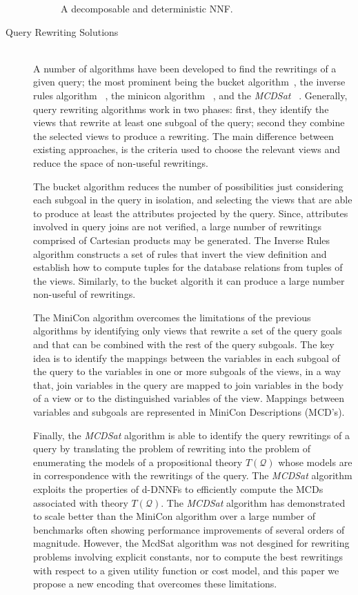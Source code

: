 \documentclass{llncs}
\newcommand{\Q}{\mathcal{Q}}
\newcommand{\Theory}[1]{T(#1)}
\begin{document}
\begin{description}
\begin{figure}
\centering
\caption{A decomposable and deterministic NNF.}
\label{fig:dnnf}
\end{figure}


\item[Query Rewriting Solutions] \mbox{}\\
A number of algorithms have been developed to find the rewritings of a given query; the most prominent being the bucket algorithm~\cite{levy:bucket},  the inverse rules algorithm ~\cite{duschka:answer,Qian96}, the minicon algorithm ~\cite{pottinger:minicon}, and the {\it MCDSat} ~\cite{arvelo:aaai06}. Generally, query rewriting algorithms work in two phases: first, they identify the views that rewrite at least one  subgoal of the query; second they combine the selected views to produce a rewriting. The main difference between existing approaches, is the criteria used to choose the relevant views and reduce the space of non-useful rewritings.

The bucket algorithm reduces the number of possibilities just considering each subgoal in the query in isolation, and selecting the views that are able to  produce at least the attributes projected by the query. Since, attributes involved in query joins are not verified, a large number of rewritings comprised of  Cartesian products may  be generated. 	
The Inverse Rules algorithm constructs a set of rules that invert the view definition and establish how to compute tuples for the database relations from tuples of the views. Similarly, to the bucket algorith it can produce a large number non-useful of rewritings. 

The MiniCon algorithm  overcomes the limitations of the previous algorithms by identifying only views that rewrite a set of the query goals and that  can be combined with the rest of the query subgoals. The key idea is to identify the mappings between  the variables in each subgoal of the query to the variables  in one or more subgoals of the views, in a way that, join variables in the query are mapped to join variables in the body of a view or to the distinguished variables of the view. Mappings between variables and subgoals are represented in MiniCon Descriptions (MCD's)\cite{pottinger:minicon}.

Finally,  the
{\it MCDSat} algorithm is able to identify the query rewritings of a query by translating the problem of rewriting
into the problem of enumerating the models of a propositional
theory  $\Theory{\Q}$ whose models are in correspondence
with the rewritings of the query. 
The {\it MCDSat} algorithm exploits the properties of d-DNNFs to efficiently 
compute the MCDs associated with theory $\Theory{\Q}$.
The  {\it MCDSat} algorithm has demonstrated to scale better than the MiniCon
algorithm over a large number of benchmarks often showing performance
improvements of several orders of magnitude. However, the McdSat algorithm was not desgined for rewriting problems involving explicit constants,
nor to compute the best rewritings with respect to a given utility function or cost model, and this paper we propose a new encoding  that overcomes these limitations.



\end{description}
\end{document}
